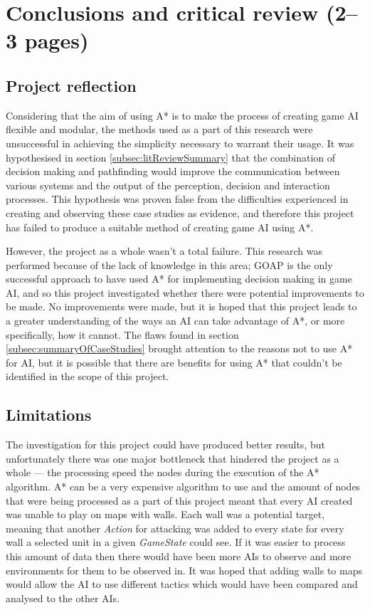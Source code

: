 \documentclass[11pt, a4paper]{report}
\begin{document}
\section{Conclusions and critical review (2--3 pages)}
\label{sec:conclusionsAndCriticalReview}

\subsection{Project reflection}
\label{subsec:projectReflection}

Considering that the aim of using A* is to make the process of creating game AI flexible and modular, the methods used as a part of this research were unsuccessful in achieving the simplicity necessary to warrant their usage. It was hypothesised in section \ref{subsec:litReviewSummary} that the combination of decision making and pathfinding would improve the communication between various systems and the output of the perception, decision and interaction processes. This hypothesis was proven false from the difficulties experienced in creating and observing these case studies as evidence, and therefore this project has failed to produce a suitable method of creating game AI using A*.

However, the project as a whole wasn't a total failure. This research was performed because of the lack of knowledge in this area; GOAP is the only successful approach to have used A* for implementing decision making in game AI, and so this project investigated whether there were potential improvements to be made. No improvements were made, but it is hoped that this project leads to a greater understanding of the ways an AI can take advantage of A*, or more specifically, how it cannot. The flaws found in section \ref{subsec:summaryOfCaseStudies} brought attention to the reasons not to use A* for AI, but it is possible that there are benefits for using A* that couldn't be identified in the scope of this project.

\subsection{Limitations}
\label{subsec:limitations}

The investigation for this project could have produced better results, but unfortunately there was one major bottleneck that hindered the project as a whole --- the processing speed the nodes during the execution of the A* algorithm. A* can be a very expensive algorithm to use and the amount of nodes that were being processed as a part of this project meant that every AI created was unable to play on maps with walls. Each wall was a potential target, meaning that another \emph{Action} for attacking was added to every state for every wall a selected unit in a given \emph{GameState} could see. If it was easier to process this amount of data then there would have been more AIs to observe and more environments for them to be observed in. It was hoped that adding walls to maps would allow the AI to use different tactics which would have been compared and analysed to the other AIs. 
\end{document}
